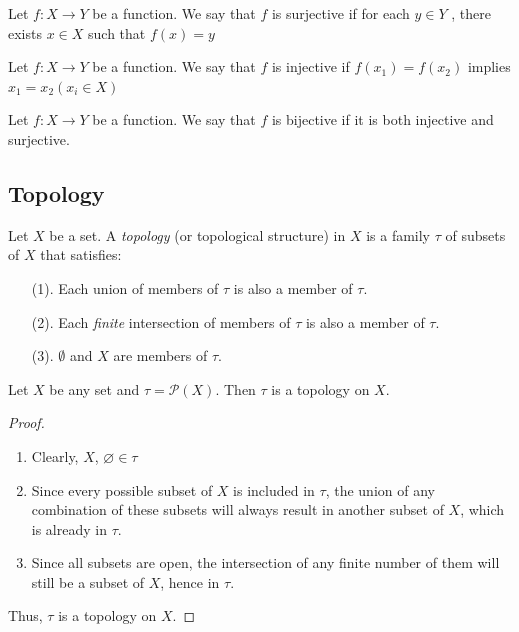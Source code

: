 \documentclass[12pt]{article} %
\begin{document}
\begin{definition}\parencite{holmes_topology}
Let $f : X \to Y$ be a function. We say that $f$ is surjective if for each $y \in Y$ , there exists $x \in X$ such that $f(x) = y$
\end{definition}

\begin{definition}\parencite{holmes_topology}
Let $f : X \to Y$ be a function. We say that
$f$ is injective if $f(x_1) = f(x_2)$ implies $x_1 = x_2 (x_i \in X)$
\end{definition}


\begin{definition}\parencite{holmes_topology}
Let \( f : X \to Y \) be a function. We say that \( f \) is bijective if it is both injective and surjective.
\end{definition}


\subsection{Topology}
\begin{definition}[Topology]\parencite{Dugundji1966} 
Let $X$ be a set. A \textit{topology} (or topological structure) in $X$ is a family $\tau $ of subsets of $X$ that satisfies:
\begin{enumerate}
    \item [(1).] Each union of members of $\tau$ is also a member of $\tau$.
    \item [(2).] Each \textit{finite} intersection of members of $\tau$ is also a member of $\tau$.
    \item [(3).] $\emptyset$ and $X$ are members of $\tau$.
\end{enumerate}
\end{definition}

\begin{example}
 Let $X$ be any set and 
 $\tau=\mathcal{P}(X)$. Then $\tau$ is a topology on $X$.
 \begin{proof}  ~\\
 \begin{enumerate}
     \item Clearly, $X$, $\varnothing \in \tau$
     \item Since every possible subset of $X$ is included in $\tau$, the union of any combination of these subsets will always result in another subset of $X$, which is already in $\tau$.
     \item Since all subsets are open, the intersection of any finite number of them will still be a subset of $X$, hence in $\tau$.
 \end{enumerate}
 Thus, $\tau$ is a topology on $X$.
 \end{proof}
\end{example}
\end{document}
